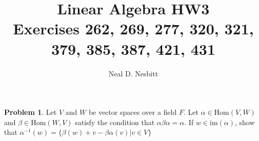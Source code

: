 \documentclass{article}
\title{Linear Algebra HW3\\
Exercises 262, 269, 277, 320, 321, 379, 385, 387, 421, 431}
\author{Neal D. Nesbitt}
\begin{document}
\maketitle

\theoremstyle{definition}
\newtheorem{problem}{Problem}[section]
\newtheorem{solution}{Solution}[problem]
\renewcommand{\thesolution}{\theproblem}

\setcounter{section}{6}
\setcounter{problem}{261}
\begin{problem}
Let $V$ and $W$ be vector spaces over a field $F$. Let $\alpha \in \text{Hom}(V,W)$ and $\beta \in \text{Hom}(W,V)$ satisfy the condition that $\alpha\beta\alpha = \alpha$. If $w \in \text{im}(\alpha)$, show that $\alpha^{-1}(w) = \{ \beta(w) +v -\beta\alpha(v) \vert v \in V \}$
\end{problem}
\end{document}
